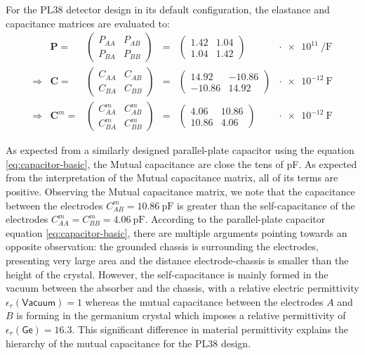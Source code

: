 For the PL38 detector design in its default configuration, the elastance and capacitance matrices are evaluated to:
\begin{equation} 
\label{eq:planar38-matrix-evaluation}
\begin{array}{rrccclc}
 & \bm{P} = &
 \begin{pmatrix}
P_{AA} & P_{AB} \\ 
P_{BA} & P_{BB}
\end{pmatrix}
&=&
\begin{pmatrix}
1.42 & 1.04 \\
1.04 & 1.42
\end{pmatrix}
& \cdot \SI{e11}{\per\farad} \\
\Rightarrow & \bm{C} = &
\begin{pmatrix}
C_{AA} & C_{AB} \\ 
C_{BA} & C_{BB}
\end{pmatrix}
&=&
\begin{pmatrix}
14.92 & -10.86 \\
-10.86 & 14.92
\end{pmatrix}
& \cdot \SI{e-12}{\farad} \\
\Rightarrow & \bm{C}^m = &
\begin{pmatrix}
C_{AA}^m & C_{AB}^m \\ 
C_{BA}^m & C_{BB}^m
\end{pmatrix}
&=&
\begin{pmatrix}
4.06 & 10.86 \\
10.86 & 4.06
\end{pmatrix}
& \cdot \SI{e-12}{\farad}
\end{array}
\end{equation}
 
As expected from a similarly designed parallel-plate capacitor using the equation \ref{eq:capacitor-basic}, the Mutual capacitance are close the tens of \si{\pico\farad}. As expected from the interpretation of the Mutual capacitance matrix, all of its terms are positive. Observing the Mutual capacitance matrix, we note that the capacitance between the electrodes $C_{AB}^m=\SI{10.86}{\pico\farad}$ is greater than the self-capacitance of the electrodes $C_{AA}^m = C_{BB}^m = \SI{4.06}{\pico\farad}$. According to the parallel-plate capacitor equation \ref{eq:capacitor-basic}, there are multiple arguments pointing towards an opposite observation: the grounded chassis is surrounding the electrodes, presenting very large area and the distance electrode-chassis is smaller than the height of the crystal. However, the self-capacitance is mainly formed in the vacuum between the absorber and the chassis, with a relative electric permittivity $\epsilon_r(\textsf{Vacuum})=1$ whereas the mutual capacitance between the electrodes $A$ and $B$ is forming in the germanium crystal which imposes a relative permittivity of $\epsilon_r(\textsf{Ge})=16.3$. This  significant difference in material permittivity explains the hierarchy of the mutual capacitance for the PL38 design.

